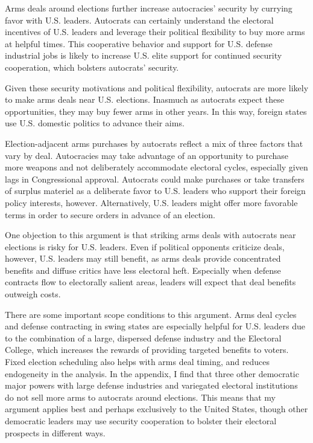 \documentclass[12pt]{article}
\begin{document}
Arms deals around elections further increase autocracies' security by currying favor with U.S. leaders.
Autocrats can certainly understand the electoral incentives of U.S. leaders and leverage their political flexibility to buy more arms at helpful times. 
This cooperative behavior and support for U.S. defense industrial jobs is likely to increase U.S. elite support for continued security cooperation, which bolsters autocrats' security.


Given these security motivations and political flexibility, autocrats are more likely to make arms deals near U.S. elections.
Inasmuch as autocrats expect these opportunities, they may buy fewer arms in other years.
In this way, foreign states use U.S. domestic politics to advance their aims. 


Election-adjacent arms purchases by autocrats reflect a mix of three factors that vary by deal.
Autocracies may take advantage of an opportunity to purchase more weapons and not deliberately accommodate electoral cycles, especially given lags in Congressional approval.
Autocrats could make purchases or take transfers of surplus materiel as a deliberate favor to U.S. leaders who support their foreign policy interests, however. 
Alternatively, U.S. leaders might offer more favorable terms in order to secure orders in advance of an election.


One objection to this argument is that striking arms deals with autocrats near elections is risky for U.S. leaders. 
Even if political opponents criticize deals, however, U.S. leaders may still benefit, as arms deals provide concentrated benefits and diffuse critics have less electoral heft.
Especially when defense contracts flow to electorally salient areas, leaders will expect that deal benefits outweigh costs. 


There are some important scope conditions to this argument. 
Arms deal cycles and defense contracting in swing states are especially helpful for U.S. leaders due to the combination of a large, dispersed defense industry and the Electoral College, which increases the rewards of providing targeted benefits to voters. 
Fixed election scheduling also helps with arms deal timing, and reduces endogeneity in the analysis.  
In the appendix, I find that three other democratic major powers with large defense industries and variegated electoral institutions do not sell more arms to autocrats around elections. 
This means that my argument applies best and perhaps exclusively to the United States, though other democratic leaders may use security cooperation to bolster their electoral prospects in different ways. 
\end{document}
